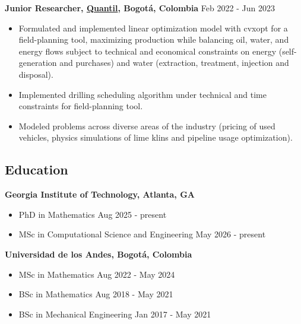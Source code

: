 \documentclass{article}
\begin{document}
\textbf{Junior Researcher, \href{https://quantil.co/en/}{\textcolor{myblue}{Quantil}}, Bogot\'a, Colombia} \hfill {Feb 2022 - Jun 2023}
\vspace{-0.3em}
\begin{itemize}
\renewcommand\labelitemi{\small$\bullet$}
\item {\small Formulated and implemented linear optimization model with cvxopt for a field-planning tool, maximizing production while balancing oil, water, and energy flows subject to technical and economical constraints on energy (self-generation and purchases) and water (extraction, treatment, injection and disposal).} \vspace{-0.5em}
\item {\small Implemented drilling scheduling algorithm under technical and time constraints for field-planning tool.} \vspace{-0.5em}
\item {\small Modeled problems across diverse areas of the industry (pricing of used vehicles, physics simulations of lime klins and pipeline usage optimization).}
\end{itemize}

\subsection*{Education}
\textbf{Georgia Institute of Technology, Atlanta, GA}
\vspace{-0.3em}
\begin{itemize}
  \item PhD in Mathematics \hfill {Aug 2025 - present}\vspace{-0.5em}
  \item MSc in Computational Science and Engineering \hfill {May 2026 - present}
\end{itemize}
\textbf{Universidad de los Andes, Bogot\'a, Colombia}
\vspace{-0.3em}
\begin{itemize}
  \item MSc in Mathematics \hfill {Aug 2022 - May 2024}\vspace{-0.5em}
\item BSc in Mathematics \hfill {Aug 2018 - May 2021}\vspace{-0.5em}
\item BSc in Mechanical Engineering \hfill {Jan 2017 - May 2021}
\end{itemize}
\end{document}
